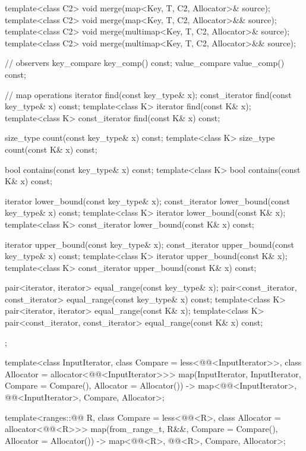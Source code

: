 \begin{codeblock}
{{    template<class C2>
      void merge(map<Key, T, C2, Allocator>& source);
    template<class C2>
      void merge(map<Key, T, C2, Allocator>&& source);
    template<class C2>
      void merge(multimap<Key, T, C2, Allocator>& source);
    template<class C2>
      void merge(multimap<Key, T, C2, Allocator>&& source);

    // observers
    key_compare key_comp() const;
    value_compare value_comp() const;

    // map operations
    iterator       find(const key_type& x);
    const_iterator find(const key_type& x) const;
    template<class K> iterator       find(const K& x);
    template<class K> const_iterator find(const K& x) const;

    size_type      count(const key_type& x) const;
    template<class K> size_type count(const K& x) const;

    bool           contains(const key_type& x) const;
    template<class K> bool contains(const K& x) const;

    iterator       lower_bound(const key_type& x);
    const_iterator lower_bound(const key_type& x) const;
    template<class K> iterator       lower_bound(const K& x);
    template<class K> const_iterator lower_bound(const K& x) const;

    iterator       upper_bound(const key_type& x);
    const_iterator upper_bound(const key_type& x) const;
    template<class K> iterator       upper_bound(const K& x);
    template<class K> const_iterator upper_bound(const K& x) const;

    pair<iterator, iterator>               equal_range(const key_type& x);
    pair<const_iterator, const_iterator>   equal_range(const key_type& x) const;
    template<class K>
      pair<iterator, iterator>             equal_range(const K& x);
    template<class K>
      pair<const_iterator, const_iterator> equal_range(const K& x) const;
  };

  template<class InputIterator, class Compare = less<@@<InputIterator>>,
           class Allocator = allocator<@@<InputIterator>>>
    map(InputIterator, InputIterator, Compare = Compare(), Allocator = Allocator())
      -> map<@@<InputIterator>, @@<InputIterator>, Compare, Allocator>;

  template<ranges::@@ R, class Compare = less<@@<R>,
           class Allocator = allocator<@@<R>>>
    map(from_range_t, R&&, Compare = Compare(), Allocator = Allocator())
      -> map<@@<R>, @@<R>, Compare, Allocator>;

}
\end{codeblock}
